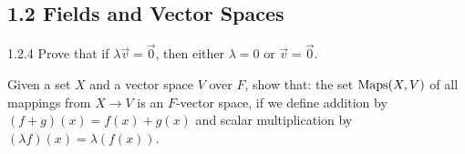 \subsection*{1.2 Fields and Vector Spaces}
\item[\textbullet] 1.2.4 Prove that if $\lambda \vec{v} = \vec{0}$, then either $\lambda = 0$ or $\vec{v} = \vec{0}$.
\item Given a set $X$ and a vector space $V$ over $F$, show that: the set $\text{Maps}(X,V)$ of all mappings from $X \to V$ is an $F$-vector space, if we define addition by $(f+g)(x) = f(x) + g(x)$ and scalar multiplication by $(\lambda f)(x) = \lambda(f(x))$.
